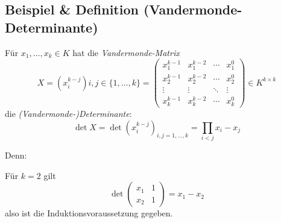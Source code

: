 \subsection{Beispiel \& Definition (Vandermonde-Determinante)}
	\begin{Definition}
		Für $ x_1,\dots, x_k\in K $ hat die \emph{Vandermonde-Matrix}
			\[ X= (x_i^{k-j})i,j\in \{1,\dots, k \} =
				\begin{pmatrix}
					x_1^{k-1}&x_1^{k-2}&\cdots & x_1^0\\
					x_2^{k-1}&x_2^{k-2}&\cdots & x_2^0\\
					\vdots & \vdots & \ddots&\vdots \\
					x_k^{k-1}&x_k^{k-2}&\cdots & x_k^0
				\end{pmatrix} \in K^{k\times k}\]
		die \emph{(Vandermonde-)Determinante}:
			\[ \det X = \det (x_i^{k-j})_{i,j = 1,\dots, k} = \prod_{i<j}x_i-x_j \]
                
		Denn:
		
		Für $ k=2 $ gilt
			\[ \det \begin{pmatrix}
				x_1&1\\x_2&1
			\end{pmatrix} = x_1-x_2\]
		also ist die Induktionsvoraussetzung gegeben.
		

\end{Definition}
